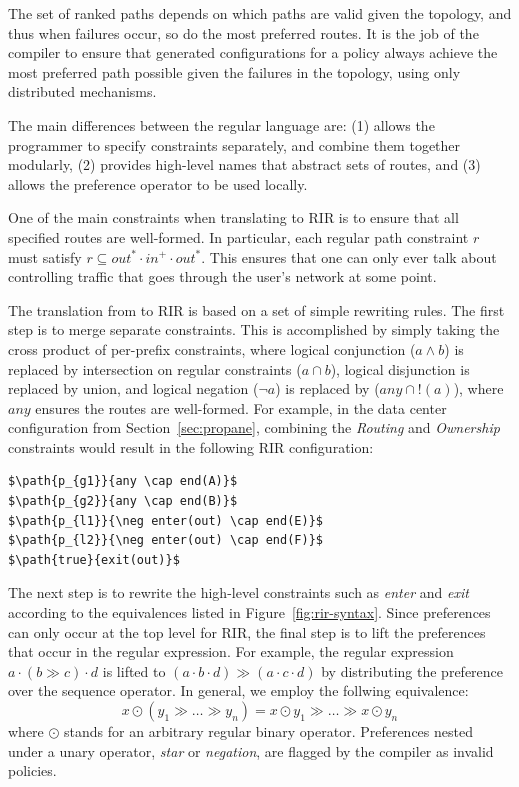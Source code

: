 The set of ranked paths depends on which paths are valid given the topology, and thus when failures occur, so do the most preferred routes. It is the job of the \sysname compiler to ensure that generated configurations for a policy always achieve the most preferred path possible given the failures in the topology, using only distributed mechanisms.



The main differences between \sysname the regular language are: (1) \sysname allows the programmer to specify constraints separately, and combine them together modularly, (2) \sysname provides high-level names that abstract sets of routes, and (3) \sysname allows the preference operator to be used locally.

One of the main constraints when translating to RIR is to ensure that all specified routes are well-formed. In particular, each regular path constraint $r$ must satisfy $r \subseteq out^* \cdot in^+ \cdot out^*$. This ensures that one can only ever talk about controlling traffic that goes through the user's network at some point.

The translation from \sysname to RIR is based on a set of simple rewriting rules.
The first step is to merge separate constraints. This is accomplished by simply taking the cross product of per-prefix constraints, where logical conjunction ($a \wedge b$) is replaced by intersection on regular constraints ($a \cap b$), logical disjunction is replaced by union, and logical negation ($\neg a$) is replaced by ($any \cap !(a)$), where $any$ ensures the routes are well-formed.
%
For example, in the data center configuration from Section~\ref{sec:propane}, combining the \textit{Routing} and \textit{Ownership} constraints would result in the following RIR configuration:

\begin{lstlisting}[mathescape=true]
$\path{p_{g1}}{any \cap end(A)}$
$\path{p_{g2}}{any \cap end(B)}$
$\path{p_{l1}}{\neg enter(out) \cap end(E)}$
$\path{p_{l2}}{\neg enter(out) \cap end(F)}$
$\path{true}{exit(out)}$
\end{lstlisting}

The next step is to rewrite the high-level constraints such as \textit{enter} and \textit{exit} according to the equivalences listed in Figure~\ref{fig:rir-syntax}. Since preferences can only occur at the top level for RIR, the final step is to lift the preferences that occur in the regular expression. For example, the regular expression $a \cdot (b \gg c) \cdot d$ is lifted to $(a \cdot b \cdot d) \gg (a \cdot c \cdot d)$ by distributing the preference over the sequence operator. In general, we employ the follwing equivalence:
%
$$x \odot (y_1 \gg \dots \gg y_n) = x \odot y_1 \gg \dots \gg x \odot y_n$$
%
where $\odot$ stands for an arbitrary regular binary operator. Preferences nested under a unary operator, \textit{star} or \textit{negation}, are flagged by the compiler as invalid policies.



